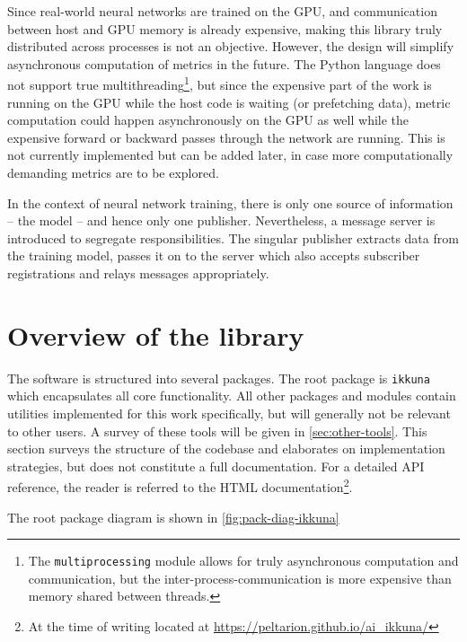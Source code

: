 Since real-world neural networks are trained on the GPU, and communication
between host and GPU memory is already expensive, making this library truly
distributed across processes is not an objective. However, the design will
simplify asynchronous computation of metrics in the future. The Python language
does not support true multithreading\footnote{The \texttt{multiprocessing}
    module allows for truly asynchronous computation and communication, but the
    inter-process-communication is more expensive than memory shared between
threads.}, but since the expensive part of the work is running on the GPU while
the host code is waiting (or prefetching data), metric computation could happen
asynchronously on the GPU as well while the expensive forward or backward passes
through the network are running. This is not currently implemented but can be
added later, in case more computationally demanding metrics are to be explored.

In the context of neural network training, there is only one source of
information -- the model -- and hence only one publisher. Nevertheless, a message server is
introduced to segregate responsibilities. The singular publisher extracts data from the
training model, passes it on to the server which also accepts subscriber
registrations and relays messages appropriately.

\hypertarget{overview-of-the-library}{%
\section{Overview of the library}\label{overview-of-the-library}}

The software is structured into several packages. The root package is
\texttt{ikkuna} which encapsulates all core
functionality. All other packages and modules contain utilities
implemented for this work specifically, but will generally not be
relevant to other users. A survey of these tools will be given in
\cref{sec:other-tools}. This section surveys the structure of the codebase and
elaborates on implementation strategies, but does not constitute a full
documentation. For a detailed API reference, the reader is referred to the HTML
documentation\footnote{At the time of writing located at \url{https://peltarion.github.io/ai_ikkuna/}}.

The root package diagram is shown in \cref{fig:pack-diag-ikkuna}

